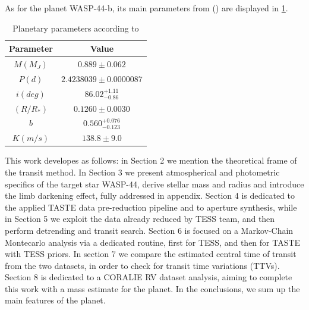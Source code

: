 \documentclass{aa}
\begin{document}
As for the planet WASP-44-b, its main parameters from (\cite{Anderson})
are displayed in \ref{table:0}. 
\begin{table}[h]
    \centering
        \begin{tabular}{cc}
        \hline
        Parameter & Value \\
        \hline
        $M (M_J)$ & $0.889\pm 0.062$ \\
        $P (d)$ & $2.4238039\pm 0.0000087$ \\
        $i (deg)$ & $86.02_{-0.86}^{+1.11}$ \\
        $(R/R_{*})$ & $ 0.1260\pm 0.0030 $\\  %
        $b$ & $0.560_{-0.123}^{+0.076}$ \\
        $K (m/s)$ & $138.8\pm 9.0$\\
        \hline
        \end{tabular}
         \caption{Planetary parameters according to \cite{Anderson}}
    \label{table:0}
\end{table}

This work developes as follows: in Section 2 we mention the theoretical frame of the transit method. In Section 3 we present atmospherical and photometric specifics of the target star WASP-44, derive stellar mass and radius and introduce the limb darkening effect, fully addressed in appendix. Section 4 is dedicated to the applied TASTE data pre-reduction pipeline and to aperture synthesis, while in Section 5 we exploit the data already reduced by TESS team, and then perform detrending and transit search. 
Section 6 is focused on a Markov-Chain Montecarlo analysis via a dedicated routine, first for TESS, and then for TASTE with TESS priors. In section 7 we compare the estimated central time of transit from the two datasets, in order to check for transit time variations (TTVs). Section 8 is dedicated to a CORALIE RV dataset analysis, aiming to complete this work with a mass estimate for the planet. In the conclusions, we sum up the main features of the planet.
\end{document}

